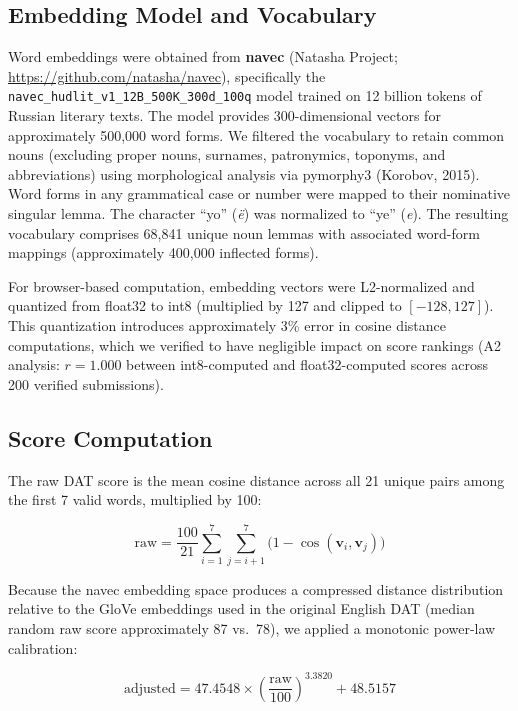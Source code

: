 \documentclass[12pt]{article}
\begin{document}
\subsection{Embedding Model and Vocabulary}

Word embeddings were obtained from \textbf{navec} (Natasha Project; \url{https://github.com/natasha/navec}), specifically the \texttt{navec\_hudlit\_v1\_12B\_500K\_300d\_100q} model trained on 12 billion tokens of Russian literary texts. The model provides 300-dimensional vectors for approximately 500,000 word forms. We filtered the vocabulary to retain common nouns (excluding proper nouns, surnames, patronymics, toponyms, and abbreviations) using morphological analysis via pymorphy3 (Korobov, 2015). Word forms in any grammatical case or number were mapped to their nominative singular lemma. The character ``yo'' (\textit{\"e}) was normalized to ``ye'' (\textit{e}). The resulting vocabulary comprises 68,841 unique noun lemmas with associated word-form mappings (approximately 400,000 inflected forms).

For browser-based computation, embedding vectors were L2-normalized and quantized from float32 to int8 (multiplied by 127 and clipped to $[-128, 127]$). This quantization introduces approximately 3\% error in cosine distance computations, which we verified to have negligible impact on score rankings (A2 analysis: $r = 1.000$ between int8-computed and float32-computed scores across 200 verified submissions).

\subsection{Score Computation}

The raw DAT score is the mean cosine distance across all 21 unique pairs among the first 7 valid words, multiplied by 100:

\begin{equation}
\text{raw} = \frac{100}{21} \sum_{i=1}^{7}\sum_{j=i+1}^{7}\bigl(1 - \cos(\mathbf{v}_i, \mathbf{v}_j)\bigr)
\label{eq:raw}
\end{equation}

Because the navec embedding space produces a compressed distance distribution relative to the GloVe embeddings used in the original English DAT (median random raw score approximately 87 vs.\ 78), we applied a monotonic power-law calibration:

\begin{equation}
\text{adjusted} = 47.4548 \times \left(\frac{\text{raw}}{100}\right)^{3.3820} + 48.5157
\label{eq:calibration}
\end{equation}
\end{document}
